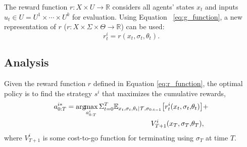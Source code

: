 \documentclass[letterpaper, 10 pt, conference]{ieeeconf}  %
\newcommand{\argmax}{\arg\!\!\max}
\begin{document}
The reward function $r: X \times U \rightarrow \mathbb{R}$ considers all agents' states $x_t$ and inputs $u_t \in U = U^1\times \cdots \times U^k$ for evaluation. Using Equation ~\ref{eq:g_function}, a new representation of $r$ ($r:X\times \Sigma \times \Theta \rightarrow \mathbb{R}$) can be used:
\begin{equation}\label{eq:r_function}
r^i_t = r(x_t,\sigma_t,\theta_t).
\end{equation}



\subsection{Analysis}
Given the reward function $r$ defined in Equation \ref{eq:r_function}, the optimal 
policy is to find the strategy $s^i$ that maximizes the cumulative rewards,
\begin{equation}\label{eq:optimal}
\begin{aligned}
  a^{i*}_{0:T} = \argmax_{a^i_{0:T}} 
  \Sigma_{t=0}^{T} 
  \mathbb{E}_{x_t,\sigma_{t},\theta_t|\mathcal{T},\sigma_{0:t-1}} \big{[}
  r^i_t(x_t,\sigma_t,&\theta_t)\big{]}+ \\ 
  V^i_{T+1}(x_T,\sigma_T,&\theta_T), 
\end{aligned}
\end{equation}
where $V^i_{T+1}$ is some cost-to-go function for terminating using $\sigma_T$ at 
time $T$.
\end{document}
